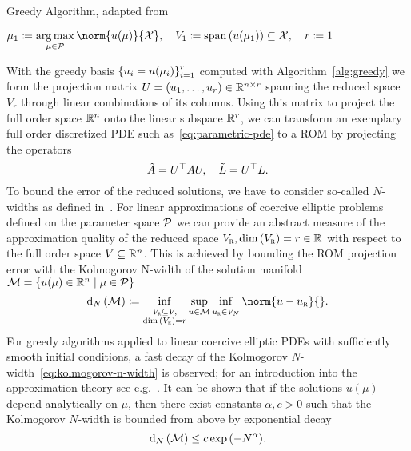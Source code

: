\begin{algorithm}\label{alg:greedy}
    \caption{Greedy Algorithm, adapted from~\cite[Algorithm~1]{Buffa2012}}
    $\mu_1 \coloneqq \argmax\limits_{\mu \in \mcl{P}} \norm{u(\mu)}{\mcl{X}},\quad V_1 \coloneqq \lspn{u(\mu_1)} \subseteq \mcl{X},\quad r \coloneqq 1$\;
\end{algorithm}

With the greedy basis ${\left\{u_i = u(\mu_i)\right\}}_{i = 1}^r$ computed with Algorithm~\ref{alg:greedy} we form the projection matrix $U = \left( u_1, \dots, u_r \right) \in \mathbb{R}^{n \times r}$ spanning the reduced space $V_r$ through linear combinations of its columns.
Using this matrix to project the full order space $\mathbb{R}^n$ onto the linear subspace $\mathbb{R}^r$, we can transform an exemplary full order discretized \ac{PDE} such as~\eqref{eq:parametric-pde} to a \ac{ROM} by projecting the operators
\begin{equation*}
    \tilde{A} = U^{\top} A U,\quad \tilde{L} = U^{\top} L.
\end{equation*}
To bound the error of the reduced solutions, we have to consider so-called $N$-widths as defined in~\cite{Pinkus1985}.
For linear approximations of coercive elliptic problems defined on the parameter space $\mathcal{P}$ we can provide an abstract measure of the approximation quality of the reduced space $V_{\textnormal{\scshape r}}, \dim{(V_{\textnormal{\scshape r}})} = r \in \mathbb{R}$ with respect to the full order space $V \subseteq \mathbb{R}^n$.
This is achieved by bounding the \ac{ROM} projection error with the Kolmogorov N-width of the solution manifold $\mathcal{M} = \left\{u(\mu) \in \mathbb{R}^n\mid\mu \in \mathcal{P}\right\}$
\begin{equation}\label{eq:kolmogorov-n-width}
    \kolm{\mcl{M}} \coloneqq \eqinf\limits_{\substack{V_\msc{r} \subseteq V,\\\dim{(V_\msc{r})} = r}} \sup\limits_{u \in \mcl{M}} \eqinf\limits_{u_\msc{r} \in V_N} \norm{u - u_\msc{r}}{}.
\end{equation}
For greedy algorithms applied to linear coercive elliptic \acp{PDE} with sufficiently smooth initial conditions, a fast decay of the Kolmogorov $N$-width~\eqref{eq:kolmogorov-n-width} is observed; for an introduction into the approximation theory see e.g.~\cite{Binev2011, DeVore2013}.
It can be shown that if the solutions $u(\mu)$ depend analytically on $\mu$, then there exist constants $\alpha, c > 0$ such that the Kolmogorov $N$-width is bounded from above by exponential decay
\begin{equation*}
    \mathop{}\!\mathrm{d}_N\left(\mathcal{M}\right) \leq c \exp{(-N^\alpha)}.
\end{equation*}


